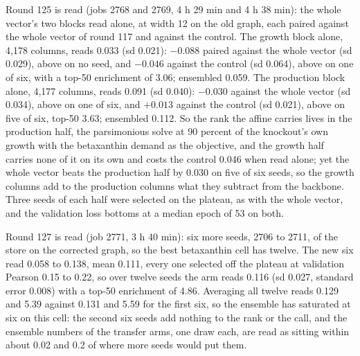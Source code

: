Round 125 is read (jobs 2768 and 2769, 4 h 29 min and 4 h 38 min): the whole vector's
two blocks read alone, at width 12 on the old graph, each paired against the whole
vector of round 117 and against the control. The growth block alone, 4,178 columns,
reads 0.033 (sd 0.021): $-0.088$ paired against the whole vector (sd 0.029), above on
no seed, and $-0.046$ against the control (sd 0.064), above on one of six, with a top-50
enrichment of 3.06; ensembled 0.059. The production block alone, 4,177 columns, reads
0.091 (sd 0.040): $-0.030$ against the whole vector (sd 0.034), above on one of six, and
$+0.013$ against the control (sd 0.021), above on five of six, top-50 3.63; ensembled
0.112. So the rank the affine carries lives in the production half, the parsimonious
solve at 90 percent of the knockout's own growth with the betaxanthin demand as the
objective, and the growth half carries none of it on its own and costs the control
0.046 when read alone; yet the whole vector beats the production half by 0.030 on five
of six seeds, so the growth columns add to the production columns what they subtract
from the backbone. Three seeds of each half were selected on the plateau, as with the
whole vector, and the validation loss bottoms at a median epoch of 53 on both.

Round 127 is read (job 2771, 3 h 40 min): six more seeds, 2706 to 2711, of the store on
the corrected graph, so the best betaxanthin cell has twelve. The new six read 0.058 to
0.138, mean 0.111, every one selected off the plateau at validation Pearson 0.15 to
0.22, so over twelve seeds the arm reads 0.116 (sd 0.027, standard error 0.008) with a
top-50 enrichment of 4.86. Averaging all twelve reads 0.129 and 5.39 against 0.131 and
5.59 for the first six, so the ensemble has saturated at six on this cell: the second
six seeds add nothing to the rank or the call, and the ensemble numbers of the transfer
arms, one draw each, are read as sitting within about 0.02 and 0.2 of where more seeds
would put them.

